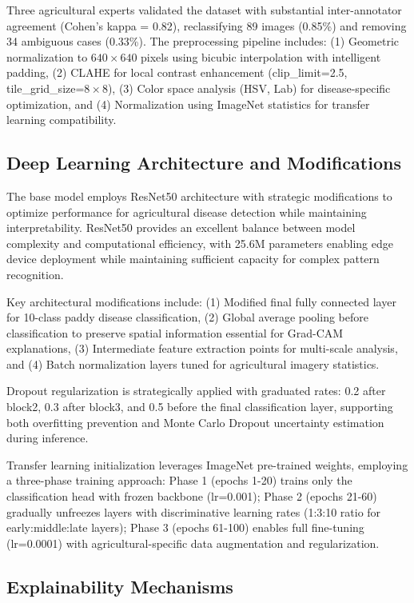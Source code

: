 \documentclass[agriculture,article,submit,pdftex,moreauthors]{Definitions/mdpi}
\begin{document}
Three agricultural experts validated the dataset with substantial inter-annotator agreement (Cohen's kappa = 0.82), reclassifying 89 images (0.85\%) and removing 34 ambiguous cases (0.33\%). The preprocessing pipeline includes: (1) Geometric normalization to $640 \times 640$ pixels using bicubic interpolation with intelligent padding, (2) CLAHE for local contrast enhancement (clip_limit=2.5, tile_grid_size=$8 \times 8$), (3) Color space analysis (HSV, Lab) for disease-specific optimization, and (4) Normalization using ImageNet statistics for transfer learning compatibility.

\subsection{Deep Learning Architecture and Modifications}

The base model employs ResNet50 architecture with strategic modifications to optimize performance for agricultural disease detection while maintaining interpretability. ResNet50 provides an excellent balance between model complexity and computational efficiency, with 25.6M parameters enabling edge device deployment while maintaining sufficient capacity for complex pattern recognition.

Key architectural modifications include: (1) Modified final fully connected layer for 10-class paddy disease classification, (2) Global average pooling before classification to preserve spatial information essential for Grad-CAM explanations, (3) Intermediate feature extraction points for multi-scale analysis, and (4) Batch normalization layers tuned for agricultural imagery statistics.

Dropout regularization is strategically applied with graduated rates: 0.2 after block2, 0.3 after block3, and 0.5 before the final classification layer, supporting both overfitting prevention and Monte Carlo Dropout uncertainty estimation during inference.

Transfer learning initialization leverages ImageNet pre-trained weights, employing a three-phase training approach: Phase 1 (epochs 1-20) trains only the classification head with frozen backbone (lr=0.001); Phase 2 (epochs 21-60) gradually unfreezes layers with discriminative learning rates (1:3:10 ratio for early:middle:late layers); Phase 3 (epochs 61-100) enables full fine-tuning (lr=0.0001) with agricultural-specific data augmentation and regularization.

\subsection{Explainability Mechanisms}
\end{document}
